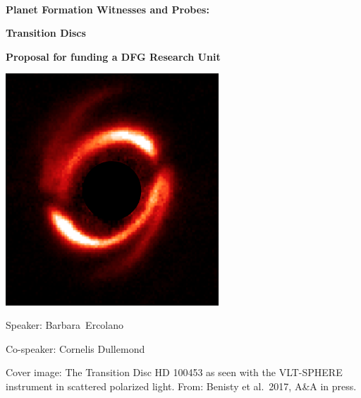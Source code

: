 \documentclass[10pt,fleqn,twoside]{article}
\newcommand{\Titlecol}{\color{Black}}
\begin{document}
\pagestyle{empty}
\mbox{}
\vspace{1cm}\\

\centerline{\Titlecol\huge \bf Planet Formation Witnesses and Probes:}
\vspace{0.5cm}
\centerline{\Titlecol\huge \bf Transition Discs}
\vspace{2cm}
\centerline{\Titlecol\Large \bf Proposal for funding a DFG Research Unit}
\vspace{2cm}
\centerline{\includegraphics[width=0.6\textwidth]{figures/HD100453.png}}
\vspace{1cm}
\centerline{\Large Speaker: Barbara~Ercolano}
\vspace{0.5cm}
\centerline{\Large Co-speaker: Cornelis Dullemond}


\pagebreak[4]

\mbox{}
\vfill
Cover image: The Transition Disc HD 100453 as seen with the VLT-SPHERE 
instrument in scattered polarized light. From: Benisty et al.~2017,
A\&A in press.

\pagebreak[4]
\end{document}
